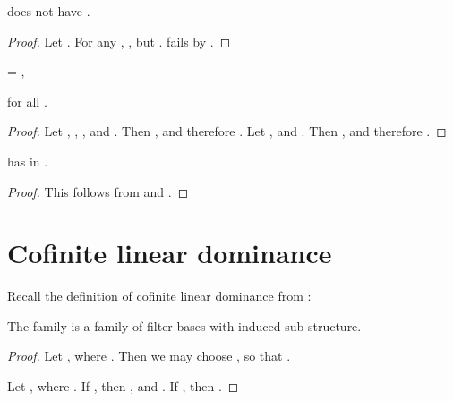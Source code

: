 \documentclass[b5paper, english, oneside]{memoir}
\begin{document}
\begin{theorem}
\label{CoasymptoticExtensibilityFails}
 does not have .
\end{theorem}

\begin{proof}
Let . For any , , but .  fails by .
\end{proof}

\begin{theorem}[ is equal to  in ]
\label{CoasymptoticIsEquivalentToCofiniteInN}
\begin{eqs}
 = ,
\end{eqs}
for all .
\end{theorem}

\begin{proof}
Let , , , and . Then , and therefore . Let , and . Then , and therefore .
\end{proof}

\begin{theorem}
\label{CoasymptoticInjectiveComposability}
 has  in .
\end{theorem}

\begin{proof}
This follows from  and .
\end{proof}

\section{Cofinite linear dominance}
\label{CofiniteLinearDominance}

Recall the definition of cofinite linear dominance from :

\begin{theorem}
\label{CofiniteLinearDominanceIsLocalLinearDominance}
The family  is a family of filter bases with induced sub-structure.
\end{theorem}

\begin{proof}
Let , where . Then we may choose , so that . 

Let , where . If , then , and . If , then . 
\end{proof}
\end{document}
